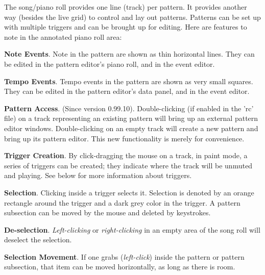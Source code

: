    The song/piano roll provides one line (track) per pattern.
   It provides another way (besides the live grid) to control
   and lay out patterns.
   Patterns can be set up with multiple triggers and can be
   brought up for editing.
   Here are features to note in the annotated piano roll area:

   \begin{enumber}
      \item \textbf{Note Events}.
         Note in the pattern are shown as thin horizontal lines.
         They can be edited in the pattern editor's piano roll,
         and in the event editor.
      \item \textbf{Tempo Events}.
         Tempo events in the pattern are shown as very small squares.
         They can be edited in the pattern editor's data panel,
         and in the event editor.
      \item \textbf{Pattern Access}. (Since version 0.99.10).
         Double-clicking (if enabled in the 'rc' file) on a track
         representing an existing pattern will bring up an external
         pattern editor windows.
         Double-clicking on an empty track will create a new pattern
         and bring up its pattern editor.
         This new functionality is merely for convenience.
      \item \textbf{Trigger Creation}.
         By click-dragging the mouse on a track, in paint mode,
         a series of triggers can be
         created; they indicate where the track will be unmuted and playing.
         See below for more information about triggers.
      \item \textbf{Selection}.
         Clicking inside a trigger selects it.
         Selection is denoted by an orange rectangle around the trigger
         and a dark grey color in the trigger.
         A pattern subsection can be moved by the mouse and deleted by
         keystrokes.
      \item \textbf{De-selection}.
         \textsl{Left-clicking} or \textsl{right-clicking} in
         an empty area of the song roll
         will deselect the selection.
      \item \textbf{Selection Movement}.
         If one grabs (\textsl{left-click}) inside
         the pattern or pattern subsection, that item can be moved
         horizontally, as long as there is room.

\end{enumber}
